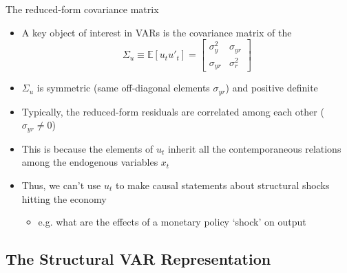 \documentclass[10pt,handout]{beamer}
\begin{document}
\begin{frame}
{The reduced-form covariance matrix}
\begin{itemize}
\item A key object of interest in VARs is the covariance matrix of the 
\begin{equation*}
\Sigma_{u}\equiv \mathbb{E}\left[u_t u'_t\right] =\left[
\begin{array}{cc}
\sigma_{y}^{2} & \sigma_{yr} \\
\sigma_{yr} & \sigma_{r}^{2}%
\end{array}%
\right]
\end{equation*}
\item $\Sigma_u$ is symmetric (same off-diagonal elements $\sigma_{yr}$) and positive definite \bigskip
\item Typically, the reduced-form residuals are correlated among each other ($\sigma_{yr}\neq 0$)\bigskip
\item This is because the elements of $u_{t}$ inherit all the contemporaneous relations among the endogenous variables $x_{t}$\bigskip
\item Thus, we can't use $u_t$ to make causal statements about structural shocks hitting the economy \smallskip
\begin{itemize}
\item e.g. what are the effects of a monetary policy `shock' on output \medskip
\end{itemize}
\end{itemize}
\end{frame}
\shownotesblock{}

\subsection{The Structural VAR Representation}
\begin{frame}
\color{title}  \par\bigskip
\color{note} 
\end{frame}
\shownotesblock{}
\end{document}
